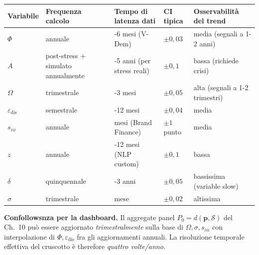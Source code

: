 {\def\LTcaptype{none} %
{\small\begin{longtable}[]{@{}
  >{\raggedright\arraybackslash}p{}
  >{\raggedright\arraybackslash}p{}
  >{\raggedright\arraybackslash}p{}
  >{\raggedright\arraybackslash}p{}
  >{\raggedright\arraybackslash}p{}@{}}
\toprule\noalign{}
\begin{minipage}[b]{\linewidth}\raggedright
Variabile
\end{minipage} & \begin{minipage}[b]{\linewidth}\raggedright
Frequenza calcolo
\end{minipage} & \begin{minipage}[b]{\linewidth}\raggedright
Tempo di latenza dati
\end{minipage} & \begin{minipage}[b]{\linewidth}\raggedright
CI tipica
\end{minipage} & \begin{minipage}[b]{\linewidth}\raggedright
Osservabilità del trend
\end{minipage} \\
\midrule\noalign{}
\endhead
\bottomrule\noalign{}
\endlastfoot
\(\Phi\) & annuale & 4-6 mesi (V-Dem) & \(\pm 0{,}03\) & media (segnali
a 1-2 anni) \\
\(A\) & post-stress + simulato annualmente & 3-5 anni (per stress reali)
& \(\pm 0{,}1\) & bassa (richiede crisi) \\
\(\Omega\) & trimestrale & 2-3 mesi & \(\pm 0{,}05\) & alta (segnali a
1-2 trimestri) \\
\(\varepsilon_{\text{dis}}\) & semestrale & 6-12 mesi & \(\pm 0{,}04\) &
media \\
\(s_{iii}\) & annuale & 3 mesi (Brand Finance) & \(\pm 1\) punto &
media \\
\(z\) & annuale & 6-12 mesi (NLP custom) & \(\pm 0{,}1\) & bassa \\
\(\delta\) & quinquennale & 1-3 anni & \(\pm 0{,}05\) & bassissima
(variable slow) \\
\(\sigma\) & trimestrale & 1 mese & \(\pm 0{,}02\) & altissima \\
\end{longtable}}
}

\Hypoth{} \textbf{Confollowsnza per la dashboard.} Il aggregate panel
\(P_0 = d(\boldsymbol{p}, \mathcal{S})\) del Ch.~10 può essere
aggiornato \emph{trimestralmente} sulla base di
\(\Omega, \sigma, s_{iii}\) con interpolazione di
\(\Phi, \varepsilon_{\text{dis}}\) fra gli aggiornamenti annuali. La
risoluzione temporale effettiva del cruscotto è therefore \emph{quattro
volte/anno}.



